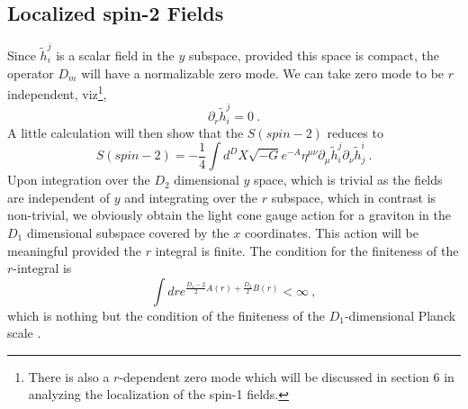 \documentclass[a4paper,12pt]{article}
\begin{document}
\subsection{Localized spin-2 Fields}
Since $\tilde h_i ^{j}$ is a scalar field in the $y$ subspace,
provided this space is compact, the operator $D_m$ will have a
normalizable zero mode.  We can take zero mode to be $r$ independent,
viz\footnote{There is also a $r$-dependent zero mode which will be
discussed in section 6 in analyzing the localization of the spin-1
fields.},
\begin{equation}
\partial_r \tilde h_i ^{j} =0~.
\end{equation}
A little calculation will then show that the $S(spin-2)$ reduces to
\begin{equation}
S(spin-2)= -\frac{1}{4}\int d^D X \sqrt{-G}e^{-A}\eta^{\mu\nu}
\partial_\mu
\tilde h_i^j\partial_{\nu} \tilde h^i_j~.
\label{spin2z}
\end{equation}
Upon integration over the $D_2$ dimensional $y$ space, which is
trivial as the fields are independent of $y$ and integrating over the
$r$ subspace, which in contrast is non-trivial, we obviously obtain
the light cone gauge action for a graviton in the $D_1$ dimensional
subspace covered by the $x$ coordinates. This action will be
meaningful provided the $r$ integral is finite. The condition for the
finiteness of the $r$-integral is
\begin{equation}
\int dr e^{\frac{D_1-2}{2} A(r)+ \frac{D_2}{2}B(r) }<\infty~,
\end{equation}
which is nothing but the condition of the finiteness of the
$D_1$-dimensional Planck scale \cite{Randall:1999vf}.
\end{document}
